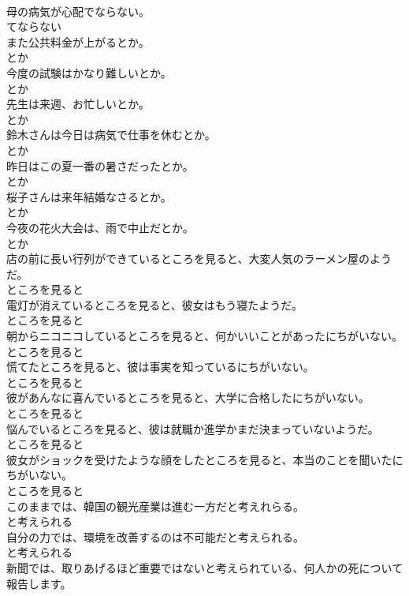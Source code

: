 \documentclass[8pt]{extreport}
\begin{document}
\begin{CJK}{UTF8}{min}
\\	母の病気が心配でならない。	
\\	てならない
\\	また公共料金が上がるとか。	
\\	とか
\\	今度の試験はかなり難しいとか。	
\\	とか
\\	先生は来週、お忙しいとか。	
\\	とか
\\	鈴木さんは今日は病気で仕事を休むとか。	
\\	とか
\\	昨日はこの夏一番の暑さだったとか。	
\\	とか
\\	桜子さんは来年結婚なさるとか。	
\\	とか
\\	今夜の花火大会は、雨で中止だとか。	
\\	とか
\\	店の前に長い行列ができているところを見ると、大変人気のラーメン屋のようだ。	
\\	ところを見ると
\\	電灯が消えているところを見ると、彼女はもう寝たようだ。	
\\	ところを見ると
\\	朝からニコニコしているところを見ると、何かいいことがあったにちがいない。	
\\	ところを見ると
\\	慌てたところを見ると、彼は事実を知っているにちがいない。	
\\	ところを見ると
\\	彼があんなに喜んでいるところを見ると、大学に合格したにちがいない。	
\\	ところを見ると
\\	悩んでいるところを見ると、彼は就職か進学かまだ決まっていないようだ。	
\\	ところを見ると
\\	彼女がショックを受けたような顔をしたところを見ると、本当のことを聞いたにちがいない。	
\\	ところを見ると
\\	このままでは、韓国の観光産業は進む一方だと考えれらる。	
\\	と考えられる
\\	自分の力では、環境を改善するのは不可能だと考えられる。	
\\	と考えられる
\\	新聞では、取りあげるほど重要ではないと考えられている、何人かの死について報告します。	

\end{CJK}
\end{document}
